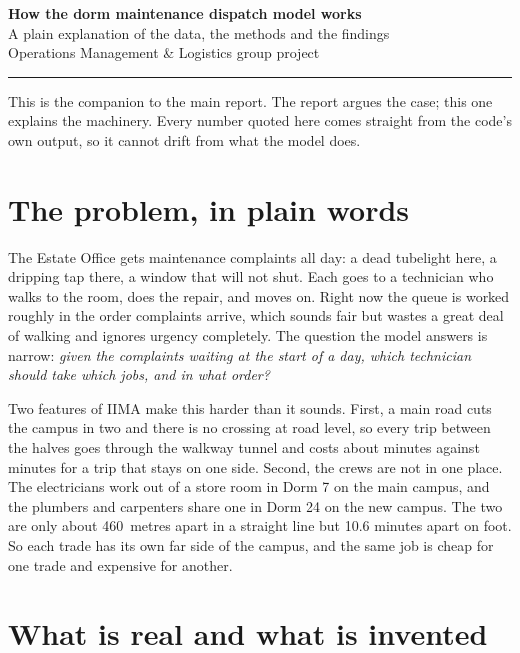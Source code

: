 \documentclass[11pt]{article}
\newcommand{\num}[1]{#1}
\begin{document}
\begin{center}
{\sffamily\bfseries\Large How the dorm maintenance dispatch model works}\\[4pt]
{\sffamily\normalsize A plain explanation of the data, the methods and the findings}\\[3pt]
{\small Operations Management \& Logistics group project}
\end{center}
\vspace{4pt}
\hrule
\vspace{8pt}

This is the companion to the main report. The report argues the case; this
one explains the machinery. Every number quoted here comes straight from the
code's own output, so it cannot drift from what the model does.

\section{The problem, in plain words}

The Estate Office gets maintenance complaints all day: a dead tubelight here,
a dripping tap there, a window that will not shut. Each goes to a technician
who walks to the room, does the repair, and moves on. Right now the queue is
worked roughly in the order complaints arrive, which sounds fair but wastes a
great deal of walking and ignores urgency completely. The question the model
answers is narrow: \emph{given the complaints waiting at the start of a day,
which technician should take which jobs, and in what order?}

Two features of IIMA make this harder than it sounds. First, a main road cuts
the campus in two and there is no crossing at road level, so every trip
between the halves goes through the walkway tunnel and costs about
\NMeanCrossCampus{} minutes against \NMeanSameCampus{} minutes for a trip
that stays on one side. Second, the crews are not in one place. The
electricians work out of a store room in Dorm 7 on the main campus, and the
plumbers and carpenters share one in Dorm 24 on the new campus. The two are
only about \num{460}~metres apart in a straight line but \num{10.6} minutes
apart on foot. So each trade has its own far side of the campus, and the same
job is cheap for one trade and expensive for another.

\section{What is real and what is invented}
\end{document}
